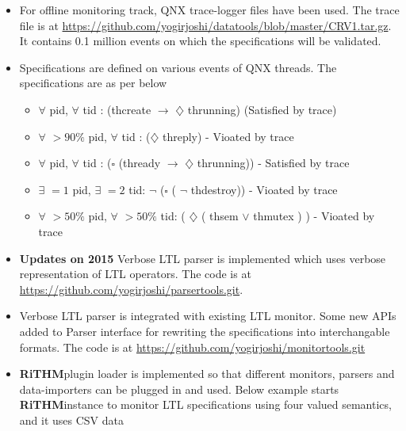 \documentclass[]{article}
\newcommand{\rithm}{\textbf{RiTHM}\space}
\begin{document}
\begin{itemize}
\begin{itemize}
	\end{itemize}
	\item For offline monitoring track, QNX trace-logger files have been used. The trace file is at \url{https://github.com/yogirjoshi/datatools/blob/master/CRV1.tar.gz}. It contains 0.1 million events on which the specifications will be validated.
	\item Specifications are defined on various events of QNX threads. The specifications are as per below
	\begin{itemize}
		\item $\forall$  pid, $\forall$ tid : (thcreate $\longrightarrow$  $\diamondsuit$ thrunning)  (Satisfied by trace)
		\item $\forall$ $>90\%$ pid, $\forall$ tid : ($\diamondsuit$ threply) - Vioated by trace
		\item $\forall$  pid, $\forall$ tid : ($\square$ (thready $\longrightarrow$   $\diamondsuit$ thrunning)) - Satisfied by trace
		\item $\exists$ $=1$ pid, $\exists$ $=2$ tid: $\lnot$ ($\square$ ( $\lnot$ thdestroy)) - Vioated by trace
		\item $\forall$ $>50\%$ pid, $\forall$ $>50\%$ tid: ( $\diamondsuit$ ( thsem $\vee$ thmutex ) ) - Vioated by trace
	\end{itemize}
	
	\item
	\textbf{Updates on  {2015}}\newline
	Verbose LTL parser is implemented which uses verbose representation of LTL operators. \newline
	The code is at \url{https://github.com/yogirjoshi/parsertools.git}.
	
	\item
	Verbose LTL parser is integrated with existing LTL monitor. Some new APIs added to Parser interface for rewriting the specifications into interchangable formats. The code is at \url{https://github.com/yogirjoshi/monitortools.git}
	
	\item
	\rithm plugin loader is implemented so that different monitors, parsers and data-importers can be plugged in and used. \newline
	Below example starts \rithm instance to monitor LTL specifications using four valued semantics, and it uses CSV data
	

\end{itemize}
\end{document}
